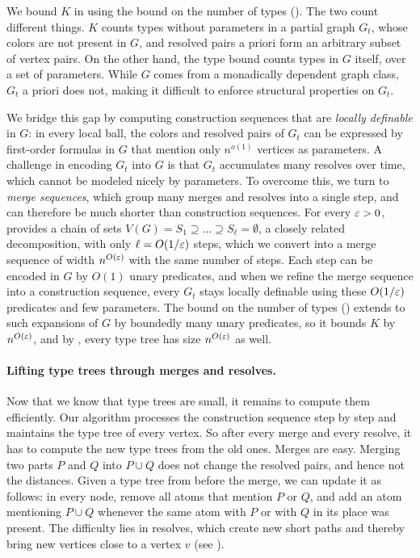 We bound $K$ in  using the bound on the number of types ().
The two count different things.
$K$ counts types without parameters in a partial graph $G_t$, whose colors are not present in $G$, and resolved pairs a priori form an arbitrary subset of vertex pairs.
On the other hand, the type bound counts types in $G$ itself, over a set of parameters.
While \(G\) comes from a monadically dependent graph class, \(G_t\) a priori does not, making it difficult to enforce structural properties on \(G_t\).

We bridge this gap by computing construction sequences that are \emph{locally definable} in $G$:
in every local ball, the colors and resolved pairs of $G_t$ can be expressed by first-order formulas in $G$ that mention only $n^{o(1)}$ vertices as parameters.
A challenge in encoding $G_t$ into $G$ is that $G_t$ accumulates many resolves over time, which cannot be modeled nicely by parameters.
To overcome this, we turn to \emph{merge sequences}, which group many merges and resolves into a single step, and can therefore be much shorter than construction sequences.
For every $\varepsilon>0$,~\cite{md-abmw} provides a chain of sets $V(G)=S_1\supseteq\dots\supseteq S_\ell=\emptyset$, a closely related decomposition, with only $\ell=O(1/\varepsilon)$ steps, which we convert into a merge sequence of width $n^{O(\varepsilon)}$ with the same number of steps.
Each step can be encoded in $G$ by $O(1)$ unary predicates, and when we refine the merge sequence into a construction sequence, every $G_t$ stays locally definable using these $O(1/\varepsilon)$ predicates and few parameters.
The bound on the number of types () extends to such expansions of $G$ by boundedly many unary predicates, so it bounds $K$ by $n^{O(\varepsilon)}$, and by , every type tree has size $n^{O(\varepsilon)}$ as well.

\paragraph{Lifting type trees through merges and resolves.}
Now that we know that type trees are small, it remains to compute them efficiently.
Our algorithm processes the construction sequence step by step and maintains the type tree of every vertex.
So after every merge and every resolve, it has to compute the new type trees from the old ones.
Merges are easy.
Merging two parts $P$ and $Q$ into $P\cup Q$ does not change the resolved pairs, and hence not the distances.
Given a type tree from before the merge, we can update it as follows:
in every node, remove all atoms that mention $P$ or $Q$, and add an atom mentioning $P\cup Q$ whenever the same atom with $P$ or with $Q$ in its place was present.
The difficulty lies in resolves, which create new short paths and thereby bring new vertices close to a vertex $v$ (see ).

